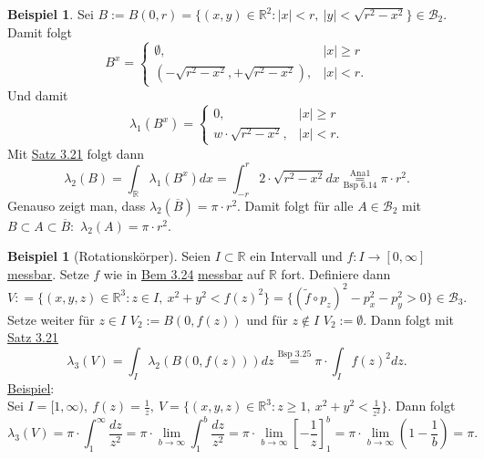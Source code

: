 \documentclass[a4paper]{scrreprt}
\newcommand{\R}{\mathbb{R}}
\newcommand{\Borel}{\mathcal{B}}
\newcommand{\toInf}{\rightarrow \infty}
\newcommand{\limToInf}[1]{\lim_{#1 \toInf}}
\newcommand{\jlabel}[1]{\label{j_#1}}
\newcommand{\jshortlink}[1]{\jhyperref{#1}{\text{#1}}}
\newcommand{\jhyperref}[2]{\hyperref[j_#1]{#2}}
\newcommand{\jlink}[1]{\jhyperref{#1}{#1}}
\newcommand{\jabb}[3]{ #1: #2 \rightarrow #3 }
\theoremstyle{plain}
\theoremstyle{definition}
\newtheorem{expl}[thm]{Beispiel}
\begin{document}
{{{{\begin{expl}
\jlabel{Bsp 3.25}
    Sei $B:=B(0,r) = \{(x,y)\in\R^2 : |x| < r, \ |y| < \sqrt{r^2 - x^2}\} \in \Borel_2$. Damit folgt
    \begin{displaymath}
        B^x = \begin{cases} \emptyset, &|x| \ge r\\ (-\sqrt{r^2-x^2},+\sqrt{r^2-x^2}), &|x|<r. \end{cases}
    \end{displaymath}
    Und damit
    \begin{displaymath}
        \lambda_1(B^x) = \begin{cases} 0, &|x|\ge r\\ w\cdot \sqrt{r^2-x^2}, &|x| <r.\end{cases}
    \end{displaymath}
    Mit \jlink{Satz 3.21} folgt dann
    \begin{displaymath}
        \lambda_2(B) = \int_\R \lambda_1(B^x)dx = \int_{-r}^r 2\cdot \sqrt{r^2-x^2}dx \overset{\text{Ana1}}{\underset{\text{Bsp 6.14}}{=}} \pi\cdot r^2.
    \end{displaymath}
    Genauso zeigt man, dass $\lambda_2(\overline{B}) = \pi \cdot r^2$. Damit folgt für alle $A\in\Borel_2$ mit $B\subset A\subset \overline{B}:$ $\lambda_2(A) = \pi\cdot r^2$.
\end{expl}


\begin{expl}[Rotationskörper]
\jlabel{Bsp 3.26}
    Seien $I\subset \R$ ein Intervall und $\jabb{f}{I}{[0,\infty]}$ \jlink{messbar}. Setze $f$ wie in \jlink{Bem 3.24} \jlink{messbar} auf $\R$ fort. Definiere dann
    \begin{displaymath}
        V: =\{(x,y,z)\in\R^3 : z\in I,\ x^2+y^2 < f(z)^2\} = \{(\tilde{f}\circ p_z)^2-p_x^2-p_y^2 > 0\} \in \Borel_3.
    \end{displaymath}
    Setze weiter für $z\in I$ $V_2:= B(0,f(z))$ und für $z\notin I$ $V_2 := \emptyset$. Dann folgt mit \jlink{Satz 3.21}
    \begin{displaymath}
        \lambda_3(V) = \int_I \lambda_2(B(0, f(z)))dz \overset{\jshortlink{Bsp 3.25}}{=} \pi\cdot \int_I f(z)^2dz.
    \end{displaymath}
    \uline{Beispiel}:\\
    Sei $I= [1,\infty), \ f(z) = \frac{1}{z}, \ V = \{(x,y,z)\in \R^3: z\ge 1, \ x^2+y^2<\frac{1}{z^2}\}$. Dann folgt
    \begin{displaymath}
        \lambda_3(V) = \pi \cdot \int_1^\infty \frac{dz}{z^2} = \pi \cdot \limToInf{b} \int_1^b \frac{dz}{z^2} = \pi \cdot \limToInf{b} \left[-\frac{1}{z}\right]_1^b = \pi\cdot \limToInf{b} \left(1 - \frac{1}{b}\right) = \pi.
    \end{displaymath}
\end{expl}

}}}}
\end{document}

